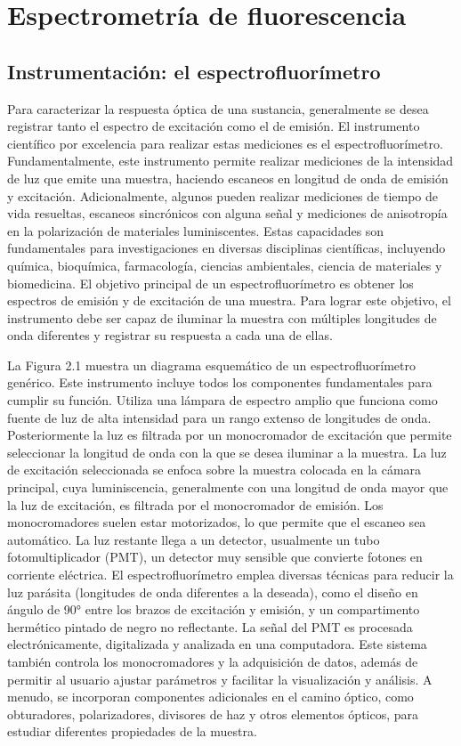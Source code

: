 
\section{Espectrometría de fluorescencia}

\subsection{Instrumentación: el espectrofluorímetro}

Para caracterizar la respuesta óptica de una sustancia, generalmente se desea registrar tanto el espectro de excitación como el de emisión. 
El instrumento científico por excelencia para realizar estas mediciones es el espectrofluorímetro. 
Fundamentalmente, este instrumento permite realizar mediciones de la intensidad de luz que emite una muestra, haciendo escaneos en longitud de onda de emisión y excitación.
Adicionalmente, algunos pueden realizar mediciones de tiempo de vida resueltas, escaneos sincrónicos con alguna señal y mediciones de anisotropía en la polarización de materiales luminiscentes.
Estas capacidades son fundamentales para investigaciones en diversas disciplinas científicas, incluyendo química, bioquímica, farmacología, ciencias ambientales, ciencia de materiales y biomedicina.
El objetivo principal de un espectrofluorímetro es obtener los espectros de emisión y de excitación de una muestra.
Para lograr este objetivo, el instrumento debe ser capaz de iluminar la muestra con múltiples longitudes de onda diferentes y registrar su respuesta a cada una de ellas.

La Figura 2.1 muestra un diagrama esquemático de un espectrofluorímetro genérico.
Este instrumento incluye todos los componentes fundamentales para cumplir su función. 
Utiliza una lámpara de espectro amplio que funciona como fuente de luz de alta intensidad para un rango extenso de longitudes de onda. 
Posteriormente la luz es filtrada por un monocromador de excitación que permite seleccionar la longitud de onda con la que se desea iluminar a la muestra.
La luz de excitación seleccionada se enfoca sobre la muestra colocada en la cámara principal, cuya luminiscencia, generalmente con una longitud de onda mayor que la luz de excitación, es filtrada por el monocromador de emisión.
Los monocromadores suelen estar motorizados, lo que permite que el escaneo sea automático. 
La luz restante llega a un detector, usualmente un tubo fotomultiplicador (PMT), un detector muy sensible que convierte fotones en corriente eléctrica.
El espectrofluorímetro emplea diversas técnicas para reducir la luz parásita (longitudes de onda diferentes a la deseada), como el diseño en ángulo de 90° entre los brazos de excitación y emisión, y un compartimento hermético pintado de negro no reflectante.
La señal del PMT es procesada electrónicamente, digitalizada y analizada en una computadora. 
Este sistema también controla los monocromadores y la adquisición de datos, además de permitir al usuario ajustar parámetros y facilitar la visualización y análisis.
A menudo, se incorporan componentes adicionales en el camino óptico, como obturadores, polarizadores, divisores de haz y otros elementos ópticos, para estudiar diferentes propiedades de la muestra.

